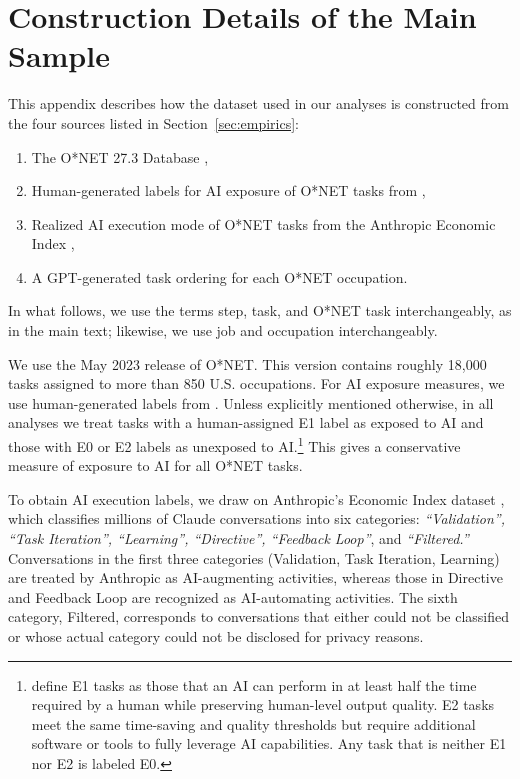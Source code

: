 \section{Construction Details of the Main Sample}
\label{app:data_prep}

This appendix describes how the dataset used in our analyses is constructed from the four sources listed in Section~\ref{sec:empirics}:
\begin{enumerate}
    \item The O*NET 27.3 Database \citep{onet27_3},
    \item Human-generated labels for AI exposure of O*NET tasks from \cite{eloundou2023gpts},
    \item Realized AI execution mode of O*NET tasks from the Anthropic Economic Index \citep{handa2025economictasksperformedai},
    \item A GPT-generated task ordering for each O*NET occupation.
\end{enumerate}
In what follows, we use the terms step, task, and O*NET task interchangeably, as in the main text; likewise, we use job and occupation interchangeably.

We use the May 2023 release of O*NET. 
This version contains roughly 18{,}000 tasks assigned to more than 850 U.S. occupations.
For AI exposure measures, we use human-generated labels from \cite{eloundou2023gpts}.
Unless explicitly mentioned otherwise, in all analyses we treat tasks with a human-assigned E1 label as exposed to AI and those with E0 or E2 labels as unexposed to AI.\footnote{
\cite{eloundou2023gpts} define E1 tasks as those that an AI can perform in at least half the time required by a human while preserving human-level output quality.
E2 tasks meet the same time-saving and quality thresholds but require additional software or tools to fully leverage AI capabilities.
Any task that is neither E1 nor E2 is labeled E0.
}
This gives a conservative measure of exposure to AI for all O*NET tasks.

To obtain AI execution labels, we draw on Anthropic's Economic Index dataset \citep{handa2025economictasksperformedai}, which classifies millions of Claude conversations into six categories: \textit{``Validation'', ``Task Iteration'', ``Learning'', ``Directive'', ``Feedback Loop''}, and \textit{``Filtered.''}
Conversations in the first three categories (Validation, Task Iteration, Learning) are treated by Anthropic as AI-augmenting activities, whereas those in Directive and Feedback Loop are recognized as AI-automating activities.
The sixth category, Filtered, corresponds to conversations that either could not be classified or whose actual category could not be disclosed for privacy reasons.

